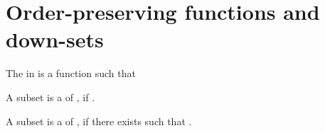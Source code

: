 \documentclass[b5paper, english, oneside]{memoir}
\begin{document}
\section{Order-preserving functions and down-sets}

\begin{definition}
The  in  is a function  such that

\end{definition}

\begin{definition}
A subset  is a  of , if .
\end{definition}

\begin{definition}
A subset  is a  of , if there exists  such that .
\end{definition}
\end{document}
